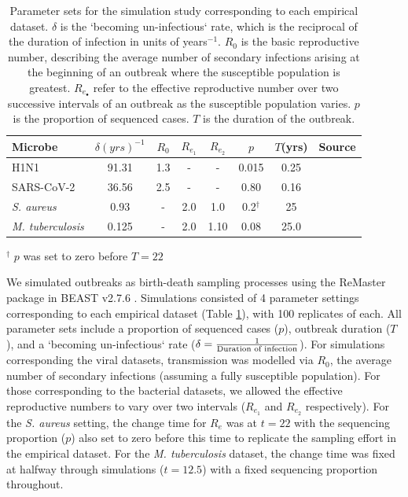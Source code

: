 \documentclass[12pt]{article}
\begin{document}
\begin{spacing}{2}
\begin{table}[H]
    \centering
    \caption{Parameter sets for the simulation study corresponding to each empirical dataset. $\delta$ is the `becoming un-infectious` rate, which is the reciprocal of the duration of infection in units of years$^{-1}$. $R_0$ is the basic reproductive number, describing the average number of secondary infections arising at the beginning of an outbreak where the susceptible population is greatest. $R_{e_\bullet}$ refer to the effective reproductive number over two successive intervals of an outbreak as the susceptible population varies. $p$ is the proportion of sequenced cases. $T$ is the duration of the outbreak.}
    \begin{tabular}{|l|c|c|c|c|c|c|l|}
    \hline
    Microbe                     &   $\delta (yrs)^{-1}$    & $R_0$ &   $R_{e_1}$   &  $R_{e_2}$    &   $p$   &   $T$(yrs)   & Source \\
    \hline
    H1N1                        &   91.31    & 1.3 &   -   &  -    &   0.015   &   0.25 & \citet{hedge_2013_real-time} \\
    SARS-CoV-2                  &   36.56    & 2.5 &   -   &  -   &   0.80   &  0.16 & \citet{lane2021genomics} \\
    \textit{S. aureus}    &   0.93    &  - &   2.0   &  1.0   &   0.2$^{\dagger}$   &   25 & \citet{duchene_2016_genome} \\
    \textit{M. tuberculosis}    &   0.125    &  - &   2.0   &  1.10    &   0.08   &   25.0 & \citet{kuhnert_tuberculosis_2018} \\
    \hline
    \end{tabular}
    \label{tab:sim_parms}
\end{table}
\footnotesize{$^\dagger$ $p$ was set to zero before $T=22$}

We simulated outbreaks as birth-death sampling processes using the ReMaster package in BEAST v2.7.6 \citep{vaughan_remaster_2024,bouckaert_beast_2019}. Simulations consisted of 4 parameter settings corresponding to each empirical dataset (Table \ref{tab:sim_parms}), with 100 replicates of each. All parameter sets include a proportion of sequenced cases ($p$), outbreak duration ($T$), and a `becoming un-infectious` rate ($\delta = \frac{1}{\textnormal{Duration of infection}}$). For simulations corresponding the viral datasets, transmission was modelled via $R_0$, the average number of secondary infections (assuming a fully susceptible population). For those corresponding to the bacterial datasets, we allowed the effective reproductive numbers to vary over two intervals ($R_{e_1}$ and $R_{e_2}$ respectively). For the \textit{S. aureus} setting, the change time for $R_e$ was at $t=22$ with the sequencing proportion ($p$) also set to zero before this time to replicate the sampling effort in the empirical dataset. For the \textit{M. tuberculosis} dataset, the change time was fixed at halfway through simulations ($t=12.5$) with a fixed sequencing proportion throughout.


\end{spacing}
\end{document}
